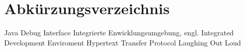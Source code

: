 
\chapter*{Abkürzungsverzeichnis}

\begin{acronym}
  {Java Debug Interface}
  {Integrierte Enwicklungsumgebung, engl. Integrated Development Enviroment}
  {Hypertext Transfer Protocol}
  {Laughing Out Loud}
\end{acronym}